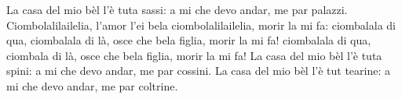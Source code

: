 \beginverse
La casa del mio bèl l'è tuta sassi:
a mi che devo andar, me par palazzi.
\endverse
\beginchorus
Ciombolalilailelia, l'amor l'ei bela
ciombolalilailelia, morir la mi fa:
ciombalala di qua, ciombalala di là,
osce che bela figlia, morir la mi fa!
ciombalala di qua, ciombala di là,
osce che bela figlia, morir la mi fa!
\endchorus
\beginverse
La casa del mio bèl l'è tuta spini:
a mi che devo andar, me par cossini.
\endverse
\beginverse
La casa del mio bèl l'è tut tearine:
a mi che devo andar, me par coltrine.
\endverse
\endsong
